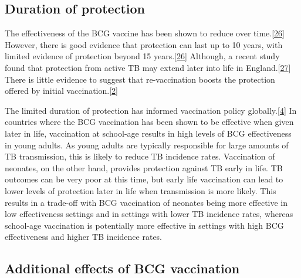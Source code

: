 \documentclass[11pt,twoside]{bristolthesis}
\begin{document}
  \hypertarget{duration-of-protection}{%
  \subsection{Duration of protection}\label{duration-of-protection}}
  
  The effectiveness of the BCG vaccine has been shown to reduce over time.{[}\protect\hyperlink{ref-Abubakar2013}{26}{]} However, there is good evidence that protection can last up to 10 years, with limited evidence of protection beyond 15 years.{[}\protect\hyperlink{ref-Abubakar2013}{26}{]} Although, a recent study found that protection from active TB may extend later into life in England.{[}\protect\hyperlink{ref-Mangtani2017}{27}{]} There is little evidence to suggest that re-vaccination boosts the protection offered by initial vaccination.{[}\protect\hyperlink{ref-TheWorldHealthOrganization:2018va}{2}{]}
  
  The limited duration of protection has informed vaccination policy globally.{[}\protect\hyperlink{ref-Zwerling2011a}{4}{]} In countries where the BCG vaccination has been shown to be effective when given later in life, vaccination at school-age results in high levels of BCG effectiveness in young adults. As young adults are typically responsible for large amounts of TB transmission, this is likely to reduce TB incidence rates. Vaccination of neonates, on the other hand, provides protection against TB early in life. TB outcomes can be very poor at this time, but early life vaccination can lead to lower levels of protection later in life when transmission is more likely. This results in a trade-off with BCG vaccination of neonates being more effective in low effectiveness settings and in settings with lower TB incidence rates, whereas school-age vaccination is potentially more effective in settings with high BCG effectiveness and higher TB incidence rates.
  
  \hypertarget{additional-effects-of-bcg-vaccination}{%
  \subsection{Additional effects of BCG vaccination}\label{additional-effects-of-bcg-vaccination}}
  
\end{document}
